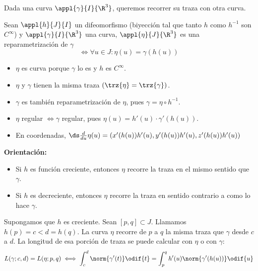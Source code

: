 \documentclass[12pt]{article}
\begin{document}
Dada una curva $\appl{\gamma}{I}{\R^3}$, queremos recorrer su traza con otra curva.
\begin{defn}
	Sean $\appl{h}{J}{I}$ un difeomorfismo (biyección tal que tanto $h$ como $h^{-1}$ son $C^\infty$) y $\appl{\gamma}{I}{\R^3}$ una curva, $\appl{\eta}{J}{\R^3}$ es una reparametrización de $\gamma$
	\[ \iff \forall u \in J : \eta(u)=\gamma(h(u))\]
	\begin{itemize}[topsep=1pt, itemsep=1pt,parsep=3pt]
		\item $\eta$ es curva porque $\gamma$ lo es y $h$ es $C^\infty$.
		\item $\eta$ y $\gamma$ tienen la misma traza $(\trz{\eta}=\trz{\gamma})$.
		\item $\gamma$ es también reparametrización de $\eta$, pues $\gamma = \eta \circ h^{-1}$.
		\item $\eta$ regular $\iff \gamma$ regular, pues $\eta(u) = h'(u)\cdot\gamma'(h(u))$.
		\item En coordenadas, $\ds \frac{d}{du}\eta(u)=\left(x'(h(u))h'(u), y'(h(u))h'(u), z'(h(u))h'(u)\right)$
	\end{itemize}
\end{defn}
\noindent \textbf{Orientación:}
\begin{itemize}[topsep=0pt, itemsep=1pt,parsep=3pt]
	\item Si $h$ es función creciente, entonces $\eta$ recorre la traza en el mismo sentido que $\gamma$.
	\item Si $h$ es decreciente, entonces $\eta$ recorre la traza en sentido contrario a como lo hace $\gamma$.
\end{itemize}
Supongamos que $h$ es creciente. Sean $\left[p, q\right]\subset J$. Llamamos $h(p)=c<d=h(q)$. La curva $\eta$ recorre de $p$ a $q$ la misma traza que $\gamma$ desde $c$ a $d$. La longitud de esa porción de traza se puede calcular con $\eta$ o con $\gamma$:
\[L(\gamma; c, d)=L(\eta; p, q) \iff \int_c^d\norm{\gamma'(t)}\odif{t}=\int_p^qh'(u)\norm{\gamma'(h(u))}\odif{u}\]
\end{document}
